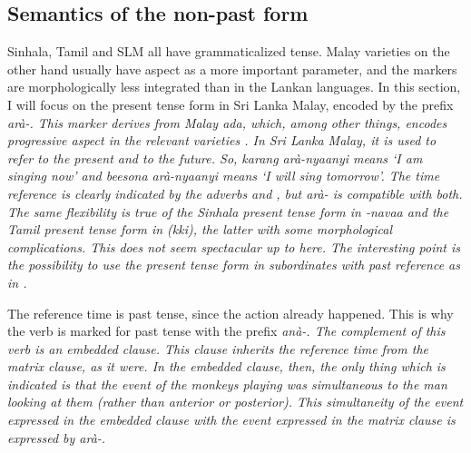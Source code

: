 \documentclass[a4paper,10pt]{article}
\newcommand{\R}{\textipa{\textsubbar{r}}}
\begin{document}
\subsection{Semantics of the non-past form}
Sinhala, Tamil and SLM all have grammaticalized tense. Malay varieties on the other hand usually have aspect as a more important parameter, and the markers are morphologically less integrated than in the Lankan languages. In this section, I will focus on the present tense form in Sri Lanka Malay, encoded by the prefix \em arà-\em. This marker derives from Malay \em ada\em, which, among other things, encodes progressive aspect in the relevant varieties \citep{Adelaar1991}. In Sri Lanka Malay, it is used to refer to the present and to the future. So, \em karang arà-nyaanyi \em means `I am singing now' and \em beesona arà-nyaanyi \em means `I will sing tomorrow'. The time reference is clearly indicated by the adverbs  and , but \em arà- \em is compatible with both. The same flexibility is true of the Sinhala present tense form in \em -navaa \em and the Tamil present tense form in \em (kki)\R{}\em, the latter with some morphological complications. This does not seem spectacular up to here. The interesting point is the possibility to use the present tense form in subordinates with past reference as in .



The reference time is past tense, since the action already happened. This is why the verb  is marked for past tense with the prefix \em anà-\em. The complement of this verb is an embedded clause. This clause inherits the  reference time from the matrix clause, as it were. In the embedded clause, then, the only thing which is indicated is that the event of the monkeys playing was simultaneous to the man looking at them (rather than anterior or posterior). This simultaneity of the event expressed in the embedded clause with the event expressed in the matrix clause is expressed by \em arà-\em.
\end{document}
